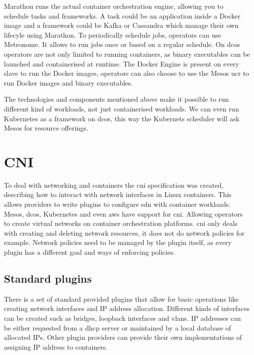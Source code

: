 Marathon\cite{marathon} runs the actual container orchestration engine, allowing you to schedule tasks and frameworks. A task could be an application inside a Docker image and a framework could be Kafka\cite{kafka} or Cassandra\cite{cassandra} which manage their own lifecyle using Marathon. To periodically schedule jobs, operators can use Metronome\cite{metronome}. It allows to run jobs once or based on a regular schedule. On \gls{dcos} operators are not only limited to running containers, as binary executables can be launched and containerised at runtime. The Docker Engine is present on every slave to run the Docker images, operators can also choose to use the Mesos \gls{ucr}\cite{ucr} to run Docker images and binary executables.

The technologies and components mentioned above make it possible to run different kind of workloads, not just containerised workloads. We can even run Kubernetes as a framework on \gls{dcos}, this way the Kubernets scheduler will ask Mesos for resource offerings.

\section{CNI}
To deal with networking and containers the \gls{cni} specification was created, describing how to interact with network interfaces in Linux containers. This allows providers to write plugins to configure \gls{sdn} with container workloads. Mesos, \gls{dcos}, Kubernetes and even \gls{aws} have support for \gls{cni}. Allowing operators to create virtual networks on container orchestration platforms.
\Gls{cni} only deals with creating and deleting network resources, it does not do network policies for example. Network policies need to be managed by the plugin itself, as every plugin has a different goal and ways of enforcing policies.

\subsection{Standard plugins}
There is a set of standard provided plugins\cite{cni_plugin} that allow for basic operations like creating network interfaces and IP address allocation. Different kinds of interfaces can be created such as bridges, loopback interfaces and \glspl{vlan}. IP addresses can be either requested from a \gls{dhcp} server or maintained by a local database of allocated IPs. Other plugin providers can provide their own implementations of assigning IP address to containers.

